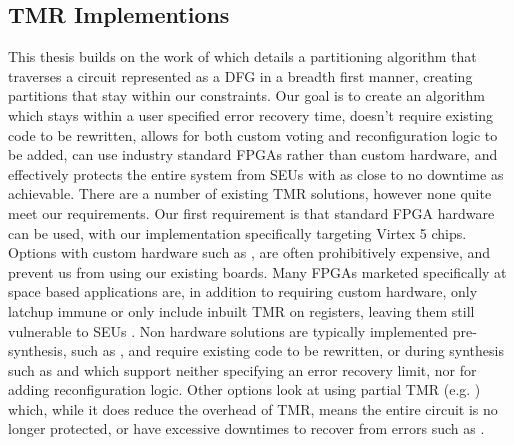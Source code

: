 \documentclass[12pt,drafta4paper,oneside]{memoir} %
\begin{document}
\subsection{\acl{TMR} Implementions}
This thesis builds on the work of\cite{DiesselChange} which details a partitioning algorithm that traverses a circuit represented as a \ac{DFG} in a breadth first manner, creating partitions that stay within our constraints.
Our goal is to create an algorithm which stays within a user specified error recovery time, doesn't require existing code to be rewritten, allows for both custom voting and reconfiguration logic to be added, can use industry standard \acp{FPGA} rather than custom hardware, and effectively protects the entire system from \acp{SEU} with as close to no downtime as achievable. There are a number of existing \ac{TMR} solutions, however none quite meet our requirements.
Our first requirement is that standard \ac{FPGA} hardware can be used, with our implementation specifically targeting Virtex 5 chips. Options with custom hardware such as \cite{VFPGATMR}, are often prohibitively expensive, and prevent us from using our existing boards.
Many \acp{FPGA} marketed specifically at space based applications are, in addition to requiring custom hardware, only latchup immune or only include inbuilt \ac{TMR} on registers, leaving them still vulnerable to \acp{SEU} \cite{FPGAReview}.
Non hardware solutions are typically implemented pre-synthesis, such as \cite{ftmr}, and require existing code to be rewritten, or during synthesis such as \cite{synplify} and \cite{tmrtool} which support neither specifying an error recovery limit, nor for adding reconfiguration logic.
Other options look at using partial \ac{TMR} (e.g. \cite{partialTMR}) which, while it does reduce the overhead of \ac{TMR}, means the entire circuit is no longer protected, or have excessive downtimes to recover from errors such as \cite{VTMR}.
\end{document}
